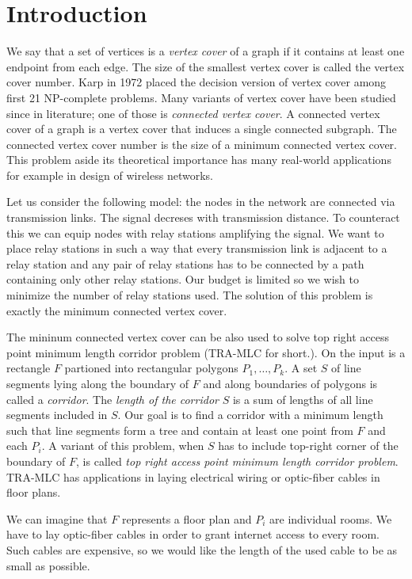 \chapter{Introduction}
We say that a set of vertices is a \emph{vertex cover} of a graph 
if it contains at least one endpoint from each edge. 
The size of the smallest vertex cover is called the vertex cover number.
Karp in 1972 placed the decision version of vertex cover among first 21 NP-complete problems.
Many variants of vertex cover have been studied since in literature; one of those is \emph{connected vertex cover}.
A connected vertex cover of a graph is a vertex cover that induces a single connected subgraph. 
The connected vertex cover number is the size of a minimum connected vertex cover.
This problem aside its theoretical importance has many real-world applications for example in design of wireless networks.

Let us consider the following model: the nodes in the network are connected via transmission links.
The signal decreses with transmission distance. 
To counteract this we can equip nodes with relay stations amplifying the signal.
We want to place relay stations in such a way that every transmission link is adjacent to a relay station
and any pair of relay stations has to be connected by a path containing only other relay stations.
Our budget is limited so we wish to minimize the number of relay stations used.
The solution of this problem is exactly the minimum connected vertex cover.

The mininum connected vertex cover can be also used to solve top right access point minimum length corridor problem (TRA-MLC for short.)\cite{Priyadarsini07}.
On the input is a rectangle \(F\) partioned into rectangular polygons \(P_1, \dots, P_k\).
A set \(S\) of line segments lying along the boundary of \(F\) and along boundaries of polygons is called a \emph{corridor}. 
The \emph{length of the corridor} \(S\) is a sum of lengths of all line segments included in \(S\). 
Our goal is to find a corridor with a minimum length such that line segments form a tree and contain at least one point from \(F\) and each \(P_i\).
A variant of this problem, when \(S\) has to include top-right corner of the boundary of \(F\),
is called \emph{top right access point minimum length corridor problem}.
TRA-MLC has applications in laying electrical wiring or optic-fiber cables in floor plans.

We can imagine that \(F\) represents a floor plan and \(P_i\) are individual rooms. 
We have to lay optic-fiber cables in order to grant internet access to every room. 
Such cables are expensive, so we would like the length of the used cable to be as small as possible.

